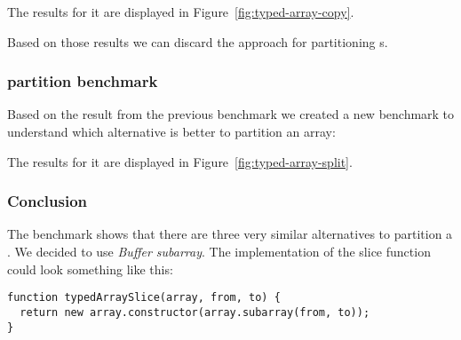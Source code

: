 The results for it are displayed in Figure~\ref{fig:typed-array-copy}.

Based on those results we can discard the  approach for partitioning \ttarray{}s.


\subsubsection{\ttarray{} partition benchmark}
Based on the result from the previous benchmark we created a new benchmark to understand which alternative is better to partition an array:

The results for it are displayed in Figure~\ref{fig:typed-array-split}.

\subsubsection{Conclusion}
The benchmark shows that there are three very similar alternatives to partition a \ttarray{}. We decided to use \textit{Buffer subarray}. The implementation of the slice function could look something like this:
\begin{lstlisting}[caption=Possible approach to copy a slice of a \ttarray{}]
function typedArraySlice(array, from, to) {
  return new array.constructor(array.subarray(from, to));
}
\end{lstlisting}

\pagebreak